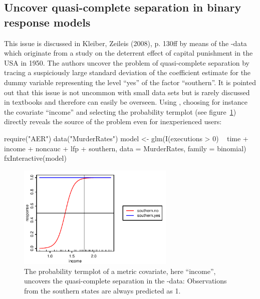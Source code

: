 \documentclass[nojss]{jss}
\newcommand{\quotes}[1]{``#1''}
\begin{document}
\subsection{Uncover quasi-complete separation in binary response models}
This issue is discussed in Kleiber, Zeileis (2008), p. 130ff by means of the -data which originate from a study on the deterrent effect of capital punishment in the USA in 1950. The authors uncover the problem of quasi-complete separation by tracing a suspiciously large standard deviation of the coefficient estimate for the dummy variable representing the level \quotes{yes} of the factor \quotes{southern}. It is pointed out that this issue is not uncommon with small data sets but is rarely discussed in textbooks and therefore can easily be overseen. Using , choosing for instance the covariate \quotes{income} and selecting the probability termplot (see figure~\ref{fig-qcs}) directly reveals the source of the problem even for inexperienced users: 
%
\begin{Schunk}
\begin{Sinput}
 require("AER")
 data("MurderRates")
 model <- glm(I(executions > 0) ~ time + income + noncauc + lfp + southern, 
     data = MurderRates, family = binomial)
 fxInteractive(model)
\end{Sinput}
\end{Schunk}
%

\begin{figure}[H]
\centering
\includegraphics[width=7.5cm]{mr-income-resp}
\caption{The probability termplot of a metric covariate, here \quotes{income}, uncovers the quasi-complete separation in the -data: Observations from the southern states are always predicted as 1.} \label{fig-qcs}
\end{figure}
\end{document}
